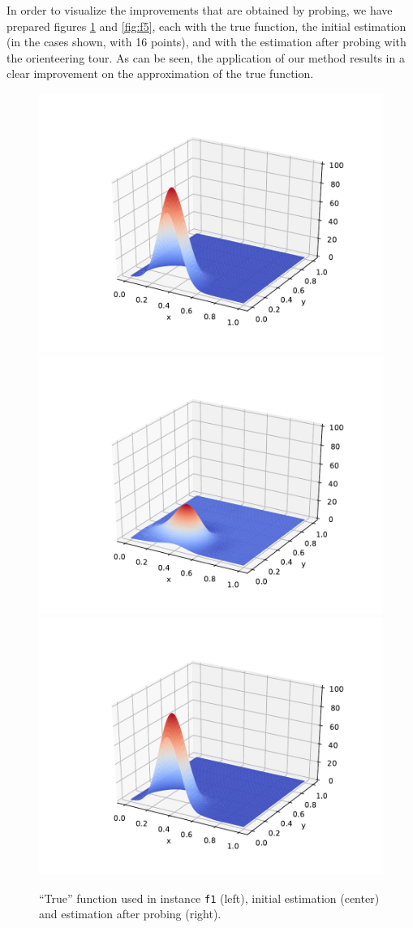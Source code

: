 \documentclass[smallextended]{svjour3}
\begin{document}
In order to visualize the improvements that are obtained by probing, we have prepared figures \ref{fig:f1} and \ref{fig:f5}, each with the true function, the initial estimation (in the cases shown, with 16 points), and with the estimation after probing with the orienteering tour.  As can be seen, the application of our method results in a clear improvement on the approximation of the true function.
\begin{figure}[h!tbp]
  \centering
  \includegraphics[width=.32\textwidth,trim=100 30 50 50,clip=True]{f1-16-true.pdf}
  \includegraphics[width=.32\textwidth,trim=100 30 50 50,clip=True]{f1-16-prev.pdf}
  \includegraphics[width=.32\textwidth,trim=100 30 50 50,clip=True]{f1-16-post.pdf}
  \caption{``True'' function used in instance \texttt{f1} (left), initial estimation (center) and estimation after probing (right).}
  \label{fig:f1}
\end{figure}
\end{document}
